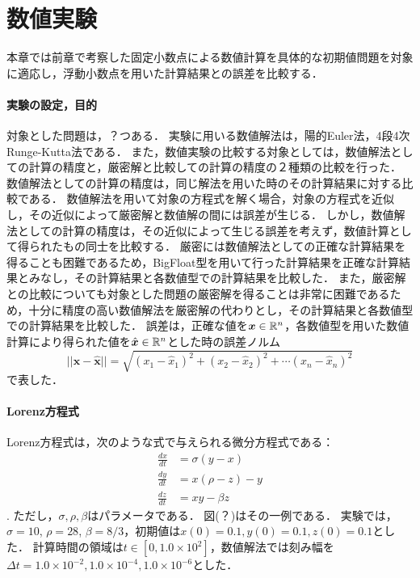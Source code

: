 \chapter{数値実験}
本章では前章で考察した固定小数点による数値計算を具体的な初期値問題を対象に適応し，浮動小数点を用いた計算結果との誤差を比較する．

\subsubsection{実験の設定，目的}
対象とした問題は，？つある．
実験に用いる数値解法は，陽的Euler法，4段4次Runge-Kutta法である．
また，数値実験の比較する対象としては，数値解法としての計算の精度と，厳密解と比較しての計算の精度の２種類の比較を行った．
数値解法としての計算の精度は，同じ解法を用いた時のその計算結果に対する比較である．
数値解法を用いて対象の方程式を解く場合，対象の方程式を近似し，その近似によって厳密解と数値解の間には誤差が生じる．
しかし，数値解法としての計算の精度は，その近似によって生じる誤差を考えず，数値計算として得られたもの同士を比較する．
厳密には数値解法としての正確な計算結果を得ることも困難であるため，BigFloat型を用いて行った計算結果を正確な計算結果とみなし，その計算結果と各数値型での計算結果を比較した．
また，厳密解との比較についても対象とした問題の厳密解を得ることは非常に困難であるため，十分に精度の高い数値解法を厳密解の代わりとし，その計算結果と各数値型での計算結果を比較した．
誤差は，正確な値を$\bm{x} \in \mathbb{R}^n$，各数値型を用いた数値計算により得られた値を$\hat{\bm{x}} \in \mathbb{R}^n$とした時の誤差ノルム
\begin{equation}
    ||\bm{x} - \hat{\bm{x}}|| = \sqrt{(x_1 - \hat{x}_1)^2 + (x_2 - \hat{x}_2)^2 + \cdots (x_n - \hat{x}_n)^2}
\end{equation}
で表した．
\subsubsection{Lorenz方程式}
Lorenz方程式は，次のような式で与えられる微分方程式である：
\begin{align}
    \frac{dx}{dt} &= \sigma(y-x) \\
    \frac{dy}{dt} &= x(\rho-z)-y \\
    \frac{dz}{dt} &= xy - \beta z
\end{align}.
ただし，$\sigma,\rho,\beta$はパラメータである．
図(？)はその一例である．
実験では，$\sigma=10$, $\rho=28$, $\beta=8/3$，初期値は$x(0) = 0.1, y(0) = 0.1, z(0) = 0.1$とした．
計算時間の領域は$t \in [0,1.0 \times 10^2]$，数値解法では刻み幅を$\Delta t =  1.0 \times 10^{-2},1.0 \times 10^{-4}, 1.0 \times 10^{-6}$とした．
